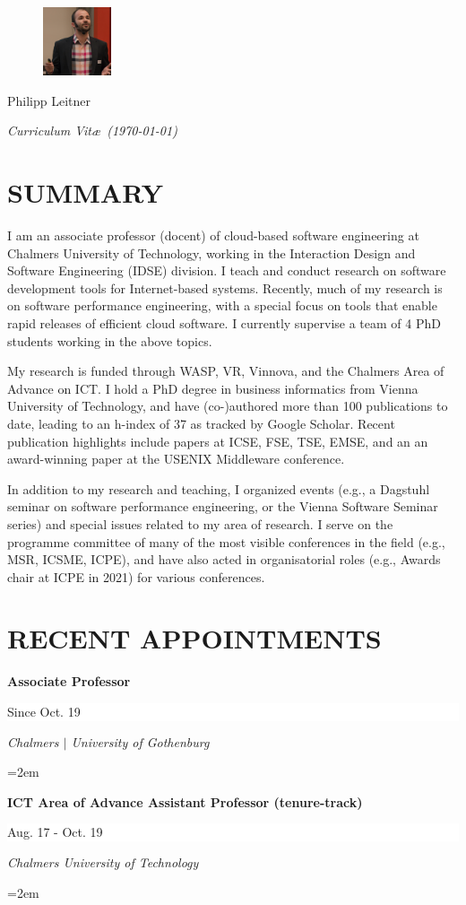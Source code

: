 \documentclass[paper=letter,fontsize=11pt]{scrartcl} %
\newcommand{\MyName}[1]{ %
		\Huge \usefont{OT1}{phv}{b}{n} \hfill #1
		\par \normalsize \normalfont}
\newcommand{\MySlogan}[1]{ %
		\large \usefont{OT1}{phv}{m}{n}\hfill \textit{#1}
		\par \normalsize \normalfont}
\newcommand{\NewPart}[2]{\section*{\uppercase{#1} #2}}
\newcommand{\EducationEntry}[4]{
		\noindent \textbf{#1} \hfill      %
		\colorbox{White}{%
			\parbox{10em}{%
			\hfill\color{Black}#2}} \par  %
		\noindent \textit{#3} \par        %
		\noindent\hangindent=2em\hangafter=0 \small #4 %
		\normalsize \par}
\begin{document}

\begin{figure}
	\vspace*{-2em}
		\includegraphics[width=0.18\textwidth]{profile.png}
\end{figure}

\MyName{Philipp Leitner}
\MySlogan{Curriculum Vit\ae\ (\today)}

\vspace{1cm}

\NewPart{Summary}{}
I am an associate professor (docent) of cloud-based software engineering at Chalmers University of Technology, working in the Interaction Design and Software Engineering (IDSE) division. I teach and conduct research on software development tools for Internet-based systems. Recently, much of my research is on software performance engineering, with a special focus on tools that enable rapid releases of efficient cloud software. I currently supervise a team of 4 PhD students working in the above topics.

My research is funded through WASP, VR, Vinnova, and the Chalmers Area of Advance on ICT. I hold a PhD degree in business informatics from Vienna University of Technology, and have (co-)authored more than 100 publications to date, leading to an h-index of 37 as tracked by Google Scholar. Recent publication highlights include papers at ICSE, FSE, TSE, EMSE, and an an award-winning paper at the USENIX Middleware conference.

In addition to my research and teaching, I organized events (e.g., a Dagstuhl seminar on software performance engineering, or the Vienna Software Seminar series) and special issues related to my area of research. I serve on the programme committee of many of the most visible conferences in the field (e.g., MSR, ICSME, ICPE), and have also acted in organisatorial roles (e.g., Awards chair at ICPE in 2021) for various conferences.


\NewPart{Recent Appointments}{}
\EducationEntry{Associate Professor}{Since Oct. 19}{Chalmers $|$ University of Gothenburg}{}
\EducationEntry{ICT Area of Advance Assistant Professor (tenure-track)}{Aug. 17 - Oct. 19}{Chalmers University of Technology}{}
\end{document}
